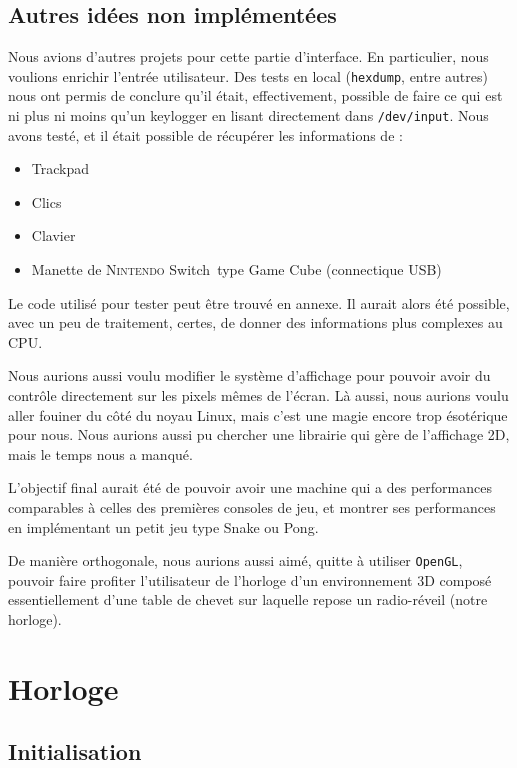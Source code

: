 \documentclass[10pt,a4paper,notitlepage ]{article}
\begin{document}
	\subsection{Autres idées non implémentées}
	
	Nous avions d'autres projets pour cette partie d'interface. En particulier, nous voulions enrichir l'entrée utilisateur. Des tests en local (\texttt{hexdump}, entre autres) nous ont permis de conclure qu'il était, effectivement, possible de faire ce qui est ni plus ni moins qu'un keylogger en lisant directement dans \texttt{/dev/input}. Nous avons testé, et il était possible de récupérer les informations de :
	\begin{itemize}
		\item Trackpad
		\item Clics
		\item Clavier
		\item Manette de \textsc{Nintendo} Switch\texttrademark\ type Game Cube (connectique USB)
	\end{itemize}
	
	Le code utilisé pour tester peut être trouvé en annexe.
	Il aurait alors été possible, avec un peu de traitement, certes, de donner des informations plus complexes au CPU. 
	
	Nous aurions aussi voulu modifier le système d'affichage pour pouvoir avoir du contrôle directement sur les pixels mêmes de l'écran. Là aussi, nous aurions voulu aller fouiner du côté du noyau Linux, mais c'est une magie encore trop ésotérique pour nous. Nous aurions aussi pu chercher une librairie qui gère de l'affichage 2D, mais le temps nous a manqué.
	
	L'objectif final aurait été de pouvoir avoir une machine qui a des performances comparables à celles des premières consoles de jeu, et montrer ses performances en implémentant un petit jeu type Snake ou Pong.
	
	De manière orthogonale, nous aurions aussi aimé, quitte à utiliser \texttt{OpenGL}, pouvoir faire profiter l'utilisateur de l'horloge d'un environnement 3D composé essentiellement d'une table de chevet sur laquelle repose un radio-réveil (notre horloge).
	

	\section{Horloge}

		\subsection{Initialisation}
\end{document}
